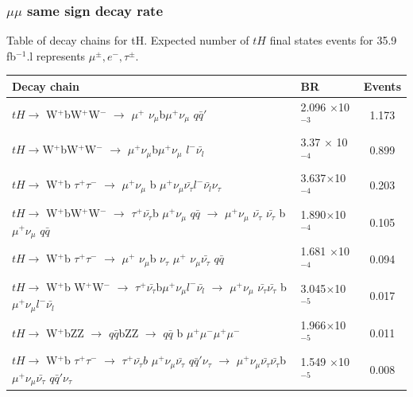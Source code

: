 \documentclass[11pt]{beamer}
\begin{document}
\begin{frame}
\frametitle{$\mu\mu$ same sign decay rate}
\tiny{Table of decay chains for tH.  Expected number of $tH$ final states events for 35.9 fb$^{-1}$.l represents $\mu^{\pm},e^- , \tau^\pm$. }
\begin{table}
\renewcommand{\arraystretch}{0.55}
\begin{tabular}{|p{8cm}|p{1.3cm}|c|}
\hline
Decay chain &BR&Events\\
\hline 
\tiny{$tH \rightarrow$ W$^+$bW$^+$W$^-$ $\rightarrow$ $\mu^+$ $\nu_\mu$b$\mu^+\nu_\mu$  $q \bar{q}'$ } &\tiny{2.096 $\times$10$^{-3}$} &  1.173  \\
\hline
\tiny{$tH \rightarrow $W$^+$bW$^+$W$^-$ $\rightarrow$ $\mu^+\nu_\mu$b$\mu^+\nu_\mu$ $l^- \bar{\nu_l}$ } &\tiny{3.37 $\times$ 10$^{-4}$} &0.899 \\
\hline
\tiny{$tH \rightarrow$ W$^+$b $\tau^+ \tau^-$ $\rightarrow$ $\mu^+ \nu_\mu$ b $ \mu^+ \nu_\mu \bar{\nu_\tau} l^-\bar{\nu_l} \nu_\tau$} &\tiny{3.637$\times$10$^{-4}$}&0.203 \\
\hline
\tiny{$tH \rightarrow$ W$^+$bW$^+$W$^-$ $\rightarrow$ $\tau^+ \bar{\nu_\tau}$b $\mu^+ \nu_\mu$  $q\bar{q}$ $\rightarrow$ $\mu^+ \nu_\mu$ $\bar{\nu_\tau}$ $\bar{\nu_\tau}$ b$\mu^+ \nu_\mu$  $q \bar{q}$} &\tiny{1.890$\times$10$^{-4}$}&0.105  \\
\hline
\tiny{$tH \rightarrow$ W$^+$b $\tau^+ \tau^-$ $\rightarrow$ $\mu^+$ $\nu_\mu$b $\nu_\tau$ $\mu^+$ $\nu_\mu \bar{\nu_\tau}$} $q \bar{q}$  &
\tiny{1.681 $\times$10$^{-4}$} & 0.094 \\
\hline
\tiny{$tH \rightarrow$ W$^+$b W$^+$W$^-$ $\rightarrow$ $\tau^+ \bar{\nu_\tau}$b$ \mu^+ \nu_\mu l^- \bar{\nu_l}$ $\rightarrow$ $\mu^+\nu_\mu$ $ \bar{\nu_\tau} \bar{\nu_\tau}$  b$ \mu^+ \nu_\mu l^- \bar{\nu_l}$} &\tiny{3.045$\times$10$^{-5}$}& 0.017\\
\hline
\tiny{$tH \rightarrow$ W$^+$bZZ $\rightarrow$ $q \bar{q}$bZZ $\rightarrow$ $q \bar{q} $ b $\mu^+ \mu^- \mu^+ \mu^-$} & \tiny{1.966$\times$10$^{-5}$} &0.011\\
\hline 
\tiny{$tH \rightarrow$ W$^+$b $\tau^+ \tau^-$ $\rightarrow$ $\tau^+ \bar{\nu_\tau}b$ $\mu^+ \nu_\mu \bar{\nu_\tau} $  $q\bar{q}' \nu_\tau$ $\rightarrow$  $\mu^+ \nu_\mu \bar{\nu_\tau}\bar{\nu_\tau} $b $\mu^+ \nu_\mu \bar{\nu_\tau} $  $q\bar{q}' \nu_\tau$ } &\tiny{1.549 $\times$10$^{-5}$} &  0.008  \\
\hline
\end{tabular}
\end{table}
\end{frame}
\end{document}
